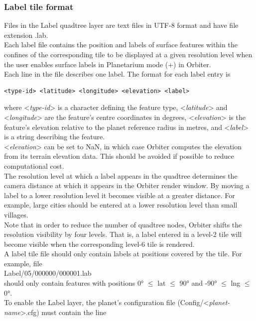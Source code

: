 \documentclass[Orbiter Developer Manual.tex]{subfiles}
\begin{document}
\subsubsection{Label tile format}
\label{sssec:label_tile_format}
Files in the Label quadtree layer are text files in UTF-8 format and have file extension .lab.\\
Each label file contains the position and labels of surface features within the confines of the corresponding tile to be displayed at a given resolution level when the user enables surface labels in Planetarium mode (\Ctrl+) in Orbiter.\\
Each line in the file describes one label. The format for each label entry is

\begin{lstlisting}[language=OSFS]
<type-id> <latitude> <longitude> <elevation> <label>
\end{lstlisting}

\noindent
where <\textit{type-id}> is a character defining the feature type, <\textit{latitude}> and <\textit{longitude}> are the feature's centre coordinates in degrees, <\textit{elevation}> is the feature's elevation relative to the planet reference radius in metres, and <\textit{label}> is a string describing the feature.\\
<\textit{elevation}> can be set to NaN, in which case Orbiter computes the elevation from its terrain elevation data. This should be avoided if possible to reduce computational cost.\\
The resolution level at which a label appears in the quadtree determines the camera distance at which it appears in the Orbiter render window. By moving a label to a lower resolution level it becomes visible at a greater distance. For example, large cities should be entered at a lower resolution level than small villages.\\
Note that in order to reduce the number of quadtree nodes, Orbiter shifts the resolution visibility by four levels. That is, a label entered in a level-2 tile will become visible when the corresponding level-6 tile is rendered.\\
A label tile file should only contain labels at positions covered by the tile. For example, file\\
\indent Label/05/000000/000001.lab\\
should only contain features with positions 0° $\leq$ lat $\leq$ 90° and -90° $\leq$ lng $\leq$ 0°.\\
To enable the Label layer, the planet's configuration file (Config/<\textit{planet-name}>.cfg) must contain the line
\end{document}
